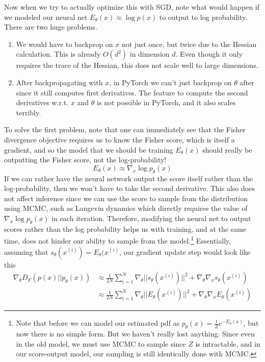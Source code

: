 \documentclass{article}
\begin{document}
    Now when we try to actually optimize this with SGD, note what would happen if we modeled our neural net $E_\theta(x) \approx \log p(x)$ to output to log probability. There are two huge problems. 
    \begin{enumerate}
      \item We would have to backprop on $x$ not just once, but twice due to the Hessian calculation. This is already $O(d^2)$ in dimension $d$. Even though it only requires the trace of the Hessian, this does not scale well to large dimensions. 
      \item After backpropagating with $x$, in PyTorch we can't just backprop on $\theta$ after since it still computes first derivatives. The feature to compute the second derivatives w.r.t. $x$ and $\theta$ is not possible in PyTorch, and it also scales terribly. 
    \end{enumerate} 
    To solve the first problem, note that one can immediately see that the Fisher divergence objective requires us to know the Fisher score, which is itself a gradient, and so the model that we should be training $E_\theta (x)$ should really be outputting the Fisher score, not the log-probability! 
    \begin{equation}
      E_\theta (x) \approx \nabla_x \log p_\theta (x)
    \end{equation} 
    If we can rather have the neural network output the score itself rather than the log-probability, then we won't have to take the second derivative. This also does not affect inference since we can use the score to sample from the distribution using MCMC, such as Langevin dynamics which directly requires the value of $\nabla_x \log p_\theta (x)$ in each iteration. Therefore, modifying the neural net to output scores rather than the log probability helps us with training, and at the same time, does not hinder our ability to sample from the model.\footnote{Note that before we can model our estimated pdf as $p_\theta (x) = \frac{1}{Z} e^{-E_\theta (x)}$, but now there is no simple form. But we haven't really lost anything. Since even in the old model, we must use MCMC to sample since $Z$ is intractable, and in our score-output model, our sampling is still identically done with MCMC.} Essentially, assuming that $s_\theta (x^{(i)}) = E_\theta (x^{(i)}$, our gradient update step would look like this
    \begin{align}
      \nabla_\theta  D_F (p(x) || p_\theta (x)) & \approx \frac{1}{2N} \sum_{i=1}^N \nabla_\theta || s_\theta (x^{(i)}) ||^2 + \nabla_\theta \nabla_x s_\theta (x^{(i)}) \\ 
                                                & \approx \frac{1}{2N} \sum_{i=1}^N \nabla_\theta || E_\theta (x^{(i)}) ||^2 + \nabla_\theta \nabla_x E_\theta (x^{(i)})
    \end{align}
\end{document}

